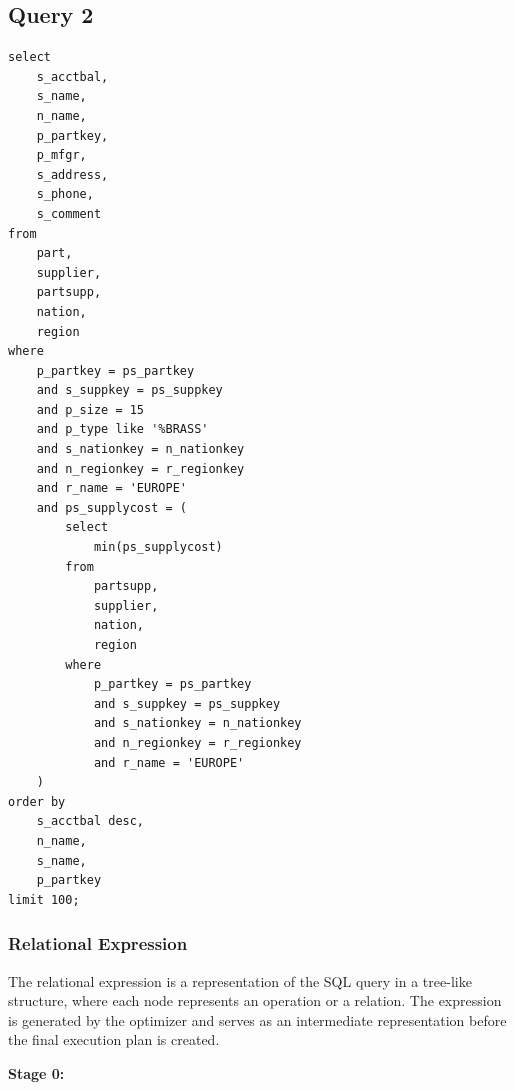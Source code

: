 \documentclass[a4paper,12pt]{scrreprt}
\begin{document}
\subsection{Query 2}
\begin{lstlisting}
select
    s_acctbal,
    s_name,
    n_name,
    p_partkey,
    p_mfgr,
    s_address,
    s_phone,
    s_comment
from
    part,
    supplier,
    partsupp,
    nation,
    region
where
    p_partkey = ps_partkey
    and s_suppkey = ps_suppkey
    and p_size = 15
    and p_type like '%BRASS'
    and s_nationkey = n_nationkey
    and n_regionkey = r_regionkey
    and r_name = 'EUROPE'
    and ps_supplycost = (
        select
            min(ps_supplycost)
        from
            partsupp,
            supplier,
            nation,
            region
        where
            p_partkey = ps_partkey
            and s_suppkey = ps_suppkey
            and s_nationkey = n_nationkey
            and n_regionkey = r_regionkey
            and r_name = 'EUROPE'
    )
order by
    s_acctbal desc,
    n_name,
    s_name,
    p_partkey
limit 100;
\end{lstlisting}

\subsubsection{Relational Expression}

The relational expression is a representation of the SQL query in a tree-like structure, where each node represents an operation or a relation. The expression is generated by the optimizer and serves as an intermediate representation before the final execution plan is created.

\textbf{Stage 0:}
\end{document}
